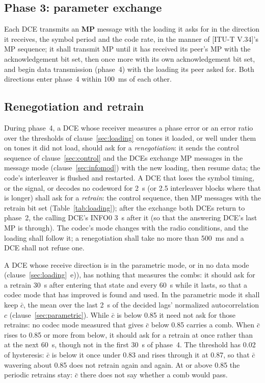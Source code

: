 \documentclass[a4paper,11pt]{article}
\newcommand{\rec}[1]{[ITU-T #1]}
\begin{document}
\subsection{Phase 3: parameter exchange}\label{sec:phase3}
Each DCE transmits an \textbf{MP} message with the loading it asks for in
the direction it receives, the symbol period and the code rate, in the
manner of \rec{V.34}'s MP sequence; it shall
transmit MP until it has received its peer's MP with the acknowledgement
bit set, then once more with its own acknowledgement bit set, and begin
data transmission (phase~4) with the loading its peer asked for.  Both
directions enter phase~4 within 100~ms of each other.

\subsection{Renegotiation and retrain}\label{sec:reneg}
During phase~4, a DCE whose receiver measures a phase error or an error
ratio over the thresholds of clause~\ref{sec:loading} on tones it loaded,
or well under them on tones it did not load, should ask for a
\emph{renegotiation}: it sends the control sequence of
clause~\ref{sec:control} and the DCEs exchange MP messages in the
message mode (clause~\ref{sec:infomod}) with the new loading, then
resume data; the code's interleaver is flushed and restarted.  A DCE
that loses the symbol timing, or the signal, or decodes no codeword for
2~s (or 2.5 interleaver blocks where that is longer) shall ask for a
\emph{retrain}: the control sequence, then MP messages with the retrain
bit set (Table~\ref{tab:loading}); after the exchange both DCEs return to
phase~2, the calling DCE's INFO0 3~s after it (so that the answering
DCE's last MP is through).  The
codec's mode changes with the radio conditions, and the loading shall
follow it; a renegotiation shall take no more than 500~ms and a DCE
shall not refuse one.

A DCE whose receive direction is in the parametric mode, or in no data
mode (clause~\ref{sec:loading}~e)), has nothing that measures the combs:
it should ask for a retrain 30~s after entering that state and every
60~s while it lasts, so that a codec mode that has improved is found and
used.  In the parametric mode it shall keep $\bar c$, the mean over the
last 2~s of the decided lags' normalized autocorrelation $c$
(clause~\ref{sec:parametric}).  While $\bar c$ is below 0.85 it need not
ask for those retrains: no codec mode measured that gives $\bar c$ below
0.85 carries a comb.  When $\bar c$ rises to 0.85 or more from below, it
should ask for a retrain at once rather than at the next 60~s, though not
in the first 30~s of phase~4.  The threshold has 0.02 of hysteresis:
$\bar c$ is below it once under 0.83 and rises through it at 0.87, so
that $\bar c$ wavering about 0.85 does not retrain again and again.  At or
above 0.85 the periodic retrains stay: $\bar c$ there does not say
whether a comb would pass.
\end{document}
